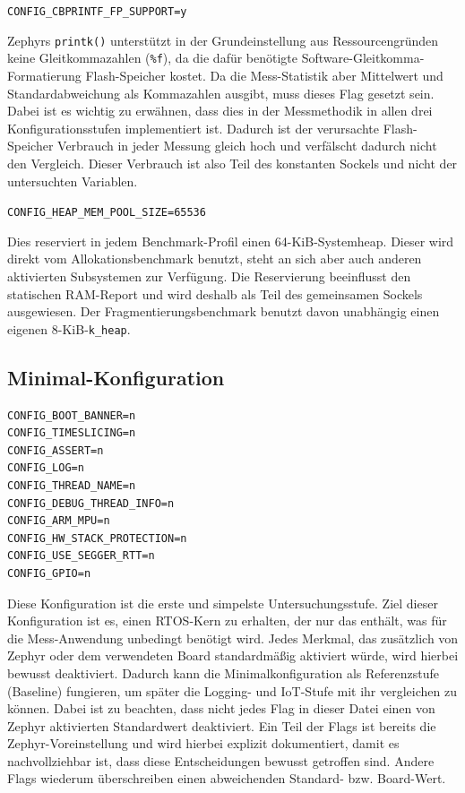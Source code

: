 \lstinline[style=fileinline]|CONFIG_CBPRINTF_FP_SUPPORT=y|

Zephyrs \lstinline[style=fileinline]|printk()| unterstützt in der Grundeinstellung aus Ressourcengründen keine Gleitkommazahlen (\lstinline[style=fileinline]|%f|), da die dafür benötigte Software-Gleitkomma-Formatierung Flash-Speicher kostet. Da die Mess-Statistik aber Mittelwert und Standardabweichung als Kommazahlen ausgibt, muss dieses Flag gesetzt sein. Dabei ist es wichtig zu erwähnen, dass dies in der Messmethodik in allen drei Konfigurationsstufen implementiert ist. Dadurch ist der verursachte Flash-Speicher Verbrauch in jeder Messung gleich hoch und verfälscht dadurch nicht den Vergleich. Dieser Verbrauch ist also Teil des konstanten Sockels und nicht der untersuchten Variablen.

\lstinline[style=fileinline]|CONFIG_HEAP_MEM_POOL_SIZE=65536|

Dies reserviert in jedem Benchmark-Profil einen 64-KiB-Systemheap. Dieser wird direkt vom Allokationsbenchmark benutzt, steht an sich aber auch anderen aktivierten Subsystemen zur Verfügung. Die Reservierung beeinflusst den statischen RAM-Report und wird deshalb als Teil des gemeinsamen Sockels ausgewiesen. Der Fragmentierungsbenchmark benutzt davon unabhängig einen eigenen 8-KiB-\lstinline[style=fileinline]|k_heap|.

\subsection{Minimal-Konfiguration}
\begin{lstlisting}[style=basecode,language=Kconfig]
CONFIG_BOOT_BANNER=n
CONFIG_TIMESLICING=n
CONFIG_ASSERT=n
CONFIG_LOG=n
CONFIG_THREAD_NAME=n
CONFIG_DEBUG_THREAD_INFO=n
CONFIG_ARM_MPU=n
CONFIG_HW_STACK_PROTECTION=n
CONFIG_USE_SEGGER_RTT=n
CONFIG_GPIO=n
\end{lstlisting}
Diese Konfiguration ist die erste und simpelste Untersuchungsstufe. Ziel dieser Konfiguration ist es, einen RTOS-Kern zu erhalten, der nur das enthält, was für die Mess-Anwendung unbedingt benötigt wird. Jedes Merkmal, das zusätzlich von Zephyr oder dem verwendeten Board standardmäßig aktiviert würde, wird hierbei bewusst deaktiviert. Dadurch kann die Minimalkonfiguration als Referenzstufe (Baseline) fungieren, um später die Logging- und IoT-Stufe mit ihr vergleichen zu können. Dabei ist zu beachten, dass nicht jedes Flag in dieser Datei einen von Zephyr aktivierten Standardwert deaktiviert. Ein Teil der Flags ist bereits die Zephyr-Voreinstellung und wird hierbei explizit dokumentiert, damit es nachvollziehbar ist, dass diese Entscheidungen bewusst getroffen sind. Andere Flags wiederum überschreiben einen abweichenden Standard- bzw. Board-Wert.

